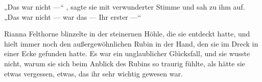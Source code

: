 „Das war nicht —“ , sagte sie mit verwunderter Stimme und sah zu ihm auf.
„Das war nicht — war das — Ihr erster —“

Rianna Felthorne blinzelte in der steinernen Höhle, die sie entdeckt hatte, und hielt immer noch den außergewöhnlichen Rubin in der Hand, den sie im Dreck in einer Ecke gefunden hatte. Es war ein unglaublicher Glücksfall, und sie wusste nicht, warum sie sich beim Anblick des Rubins so traurig fühlte, als hätte sie etwas vergessen, etwas, das ihr sehr wichtig gewesen war.

